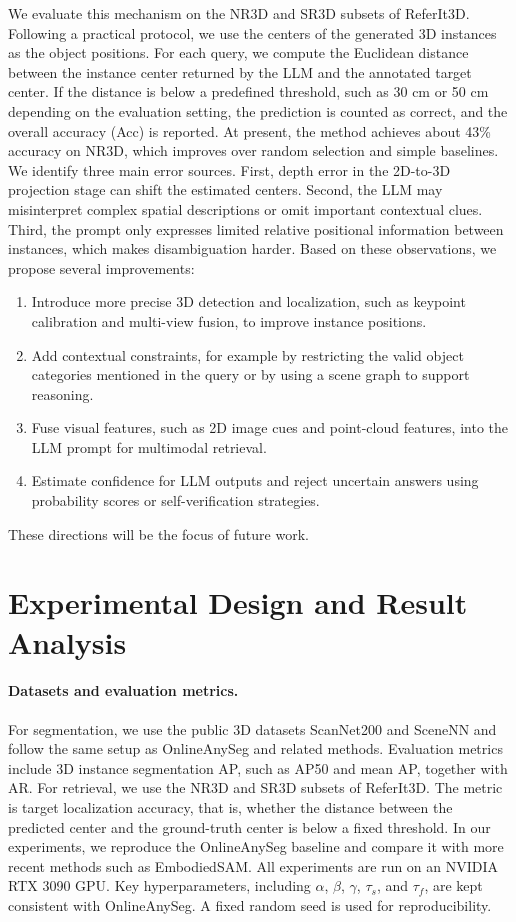 \documentclass[12pt,a4paper]{article}
\begin{document}
We evaluate this mechanism on the NR3D and SR3D subsets of ReferIt3D. Following a practical protocol, we use the centers of the generated 3D instances as the object positions. For each query, we compute the Euclidean distance between the instance center returned by the LLM and the annotated target center. If the distance is below a predefined threshold, such as 30 cm or 50 cm depending on the evaluation setting, the prediction is counted as correct, and the overall accuracy (Acc) is reported. At present, the method achieves about 43\% accuracy on NR3D, which improves over random selection and simple baselines. We identify three main error sources. First, depth error in the 2D-to-3D projection stage can shift the estimated centers. Second, the LLM may misinterpret complex spatial descriptions or omit important contextual clues. Third, the prompt only expresses limited relative positional information between instances, which makes disambiguation harder. Based on these observations, we propose several improvements:
\begin{enumerate}[leftmargin=2em]
  \item Introduce more precise 3D detection and localization, such as keypoint calibration and multi-view fusion, to improve instance positions.
  \item Add contextual constraints, for example by restricting the valid object categories mentioned in the query or by using a scene graph to support reasoning.
  \item Fuse visual features, such as 2D image cues and point-cloud features, into the LLM prompt for multimodal retrieval.
  \item Estimate confidence for LLM outputs and reject uncertain answers using probability scores or self-verification strategies.
\end{enumerate}
These directions will be the focus of future work.

\section{Experimental Design and Result Analysis}

\paragraph{Datasets and evaluation metrics.}
For segmentation, we use the public 3D datasets ScanNet200 and SceneNN and follow the same setup as OnlineAnySeg and related methods. Evaluation metrics include 3D instance segmentation AP, such as AP50 and mean AP, together with AR. For retrieval, we use the NR3D and SR3D subsets of ReferIt3D. The metric is target localization accuracy, that is, whether the distance between the predicted center and the ground-truth center is below a fixed threshold. In our experiments, we reproduce the OnlineAnySeg baseline and compare it with more recent methods such as EmbodiedSAM. All experiments are run on an NVIDIA RTX 3090 GPU. Key hyperparameters, including $\alpha$, $\beta$, $\gamma$, $\tau_s$, and $\tau_f$, are kept consistent with OnlineAnySeg. A fixed random seed is used for reproducibility.
\end{document}
